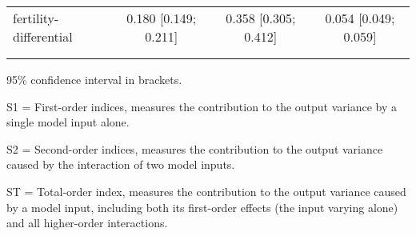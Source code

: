 \begin{table}[htp]
\begin{threeparttable}
\begin{tabular}{lccc}
	  \hspace{1.5em} fertility-differential & 0.180 [0.149; 0.211]   & 0.358 [0.305; 0.412]   & 0.054 [0.049; 0.059] \\
	 \\
    \addlinespace
    \hline
    \end{tabular}
    \begin{tablenotes}
    \scriptsize
    \item 95\% confidence interval in brackets.
    \item S1 = First-order indices,  measures the contribution to the output variance by a single model input alone.
    \item S2 = Second-order indices,  measures the contribution to the output variance caused by the interaction of two model inputs.
    \item ST = Total-order index, measures the contribution to the output variance caused by a model input, including both its first-order effects (the input varying alone) and all higher-order interactions.
    \end{tablenotes}
    \end{threeparttable}
    \end{table}